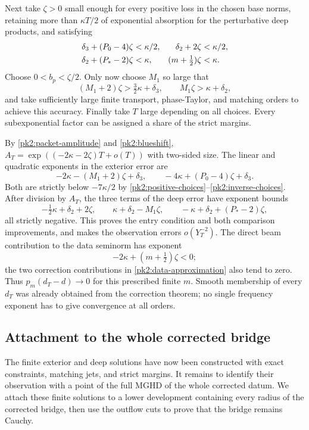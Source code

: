 Next take $\zeta>0$ small enough for every positive loss in the
chosen base norms, retaining more than $\kappa T/2$ of exponential
absorption for the perturbative deep products, and satisfying
\begin{align}
 \delta_3+(P_0-4)\zeta&<\kappa/2,&
 \delta_2+2\zeta&<\kappa/2,
 \label{pk2:positive-choices}\\
 \delta_2+(P_*-2)\zeta&<\kappa,&
 (m+\tfrac12)\zeta&<\kappa.
 \notag
\end{align}
Choose $0<b_p<\zeta/2$. Only now choose $M_1$ so large that
\begin{equation}
 (M_1+2)\zeta>\tfrac32\kappa+\delta_3,
 \qquad M_1\zeta>\kappa+\delta_2,
 \label{pk2:inverse-choices}
\end{equation}
and take sufficiently large finite transport, phase-Taylor, and
matching orders to achieve this accuracy. Finally take $T$ large
depending on all choices. Every subexponential factor can be
assigned a share of the strict margins.

By \eqref{pk2:packet-amplitude} and \eqref{pk2:blueshift},
$A_T=\exp((-2\kappa-2\zeta)T+o(T))$ with two-sided size.
The linear and quadratic exponents in the exterior error are
\[
 -2\kappa-(M_1+2)\zeta+\delta_3,
 \qquad -4\kappa+(P_0-4)\zeta+\delta_3.
\]
Both are strictly below $-7\kappa/2$ by
\eqref{pk2:positive-choices}--\eqref{pk2:inverse-choices}.
After division by $A_T$, the three terms of the deep error have
exponent bounds
\[
 -\tfrac12\kappa+\delta_2+2\zeta,
 \qquad \kappa+\delta_2-M_1\zeta,
 \qquad -\kappa+\delta_2+(P_*-2)\zeta,
\]
all strictly negative. This proves the entry condition and both
comparison improvements, and makes the observation errors
$o(Y_T^{-2})$. The direct beam contribution to the data seminorm
has exponent
\[
 -2\kappa+(m+\tfrac12)\zeta<0;
\]
the two correction contributions in
\eqref{pk2:data-approximation} also tend to zero. Thus
$p_m(d_T-d)\to0$ for this prescribed finite $m$. Smooth membership
of every $d_T$ was already obtained from the correction theorem;
no single frequency exponent has to give convergence at all orders.

\subsection{Attachment to the whole corrected bridge}
\label{pk2:attachment}

The finite exterior and deep solutions have now been constructed
with exact constraints, matching jets, and strict margins. It remains
to identify their observation with a point of the full MGHD of the
whole corrected datum. We attach these finite solutions to a lower
development containing every radius of the corrected bridge, then
use the outflow cuts to prove that the bridge remains Cauchy.


